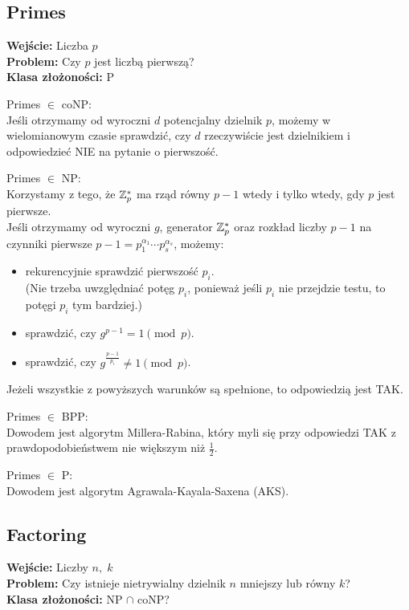 \subsection{Primes}
\textbf{Wejście:} Liczba \( p \) \\
\textbf{Problem:} Czy \( p \) jest liczbą pierwszą? \\
\textbf{Klasa złożoności:} P

Primes \( \in \) coNP: \\
Jeśli otrzymamy od wyroczni \( d \) potencjalny dzielnik \( p \), możemy w wielomianowym czasie sprawdzić, czy \( d \) rzeczywiście jest dzielnikiem i odpowiedzieć NIE na pytanie o pierwszość.

Primes \( \in \) NP: \\
Korzystamy z tego, że \( \mathbb{Z}_p^* \) ma rząd równy \( p-1 \) wtedy i tylko wtedy, gdy \( p \) jest pierwsze. \\
Jeśli otrzymamy od wyroczni \( g \), generator \( \mathbb{Z}_p^* \) oraz rozkład liczby \( p-1 \) na czynniki pierwsze \( p-1 = p_1^{\alpha_1} \cdots p_s^{\alpha_s} \), możemy:
\begin{itemize}
    \item rekurencyjnie sprawdzić pierwszość \( p_i \). \\
    (Nie trzeba uwzględniać potęg \( p_i \), ponieważ jeśli \( p_i \) nie przejdzie testu, to potęgi \( p_i \) tym bardziej.)
    \item sprawdzić, czy \( g^{p-1} = 1 \pmod{p} \).
    \item sprawdzić, czy \( g^{\frac{p-1}{p_i}} \neq 1 \pmod{p} \).
\end{itemize}
Jeżeli wszystkie z powyższych warunków są spełnione, to odpowiedzią jest TAK.

\newpage
Primes \( \in \) BPP: \\
Dowodem jest algorytm Millera-Rabina, który myli się przy odpowiedzi TAK z prawdopodobieństwem nie większym niż \( \frac{1}{2} \).

Primes \( \in \) P: \\
Dowodem jest algorytm Agrawala-Kayala-Saxena (AKS).

\subsection{Factoring}
\textbf{Wejście:} Liczby \( n,\; k \) \\
\textbf{Problem:} Czy istnieje nietrywialny dzielnik \( n \) mniejszy lub równy \( k \)? \\
\textbf{Klasa złożoności:} NP \( \cap \) coNP?

